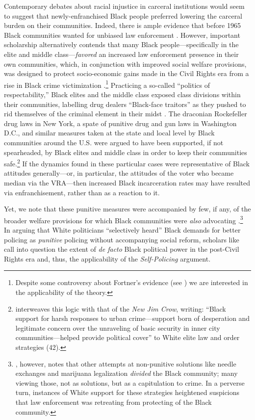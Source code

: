 \documentclass[12pt]{article}
\begin{document}
Contemporary debates about racial injustice in carceral institutions would seem to suggest that newly-enfranchised Black people preferred lowering the carceral burden on their communities.  Indeed, there is ample evidence that before 1965 Black communities wanted for unbiased law enforcement \citep{USCCRUnitedStatesCommissiononCivilRights:1965wk}.  However, important scholarship alternatively contends that many Black people---specifically in the elite and middle class---\emph{favored} an increased law enforcement presence in their own communities, which, in conjunction with improved social welfare provisions, was designed to protect socio-economic gains made in the Civil Rights era from a rise in Black crime victimization \citep{Miller:2008wb,Fortner:2015uz,FormanJr:2017tz}.\footnote{Despite some controversy about Fortner's evidence (see \cite{Murch:2015vu}) we are interested in the applicability of the theory.}  Practicing a so-called ``politics of respectability,'' Black elites and the middle class exposed class divisions within their communities, labelling drug dealers ``Black-face traitors'' as they pushed to rid themselves of the criminal element in their midst \citep{Kennedy:1998te,FormanJr:2017tz}.  The draconian Rockefeller drug laws in New York, a spate of punitive drug and gun laws in Washington D.C., and similar measures taken at the state and local level by Black communities around the U.S. were argued to have been supported, if not spearheaded, by Black elites and middle class in order to keep their communities safe.\footnote{\cite{Alexander:2012tj} interweaves this logic with that of the \emph{New Jim Crow}, writing: ``Black support for harsh responses to urban crime---support born of desperation and legitimate concern over the unraveling of basic security in inner city communities---helped provide political cover'' to White elite law and order strategies (42).}  If the dynamics found in these particular cases were representative of Black attitudes generally---or, in particular, the attitudes of the voter who became median via the VRA---then increased Black incarceration rates may have resulted via enfranchisement, rather than as a reaction to it.

Yet, we note that these punitive measures were accompanied by few, if any, of the broader welfare provisions for which Black communities were \emph{also} advocating \cite{KohlerHausmann:2015uk}.\footnote{\cite{FormanJr:2017tz}, however, notes that other attempts at non-punitive solutions like needle exchanges and marijuana legalization \emph{divided} the Black community; many viewing those, not as solutions, but as a capitulation to crime.  In a perverse turn, instances of White support for these strategies heightened suspicions that law enforcement was retreating from protecting of the Black community.} In arguing that White politicians ``selectively heard'' Black demands for better policing as \emph{punitive} policing without accompanying social reform, scholars like \cite{Hinton:2016td} call into question the extent of \emph{de facto} Black political power in the post-Civil Rights era and, thus, the applicability of the \emph{Self-Policing} argument.
\end{document}
